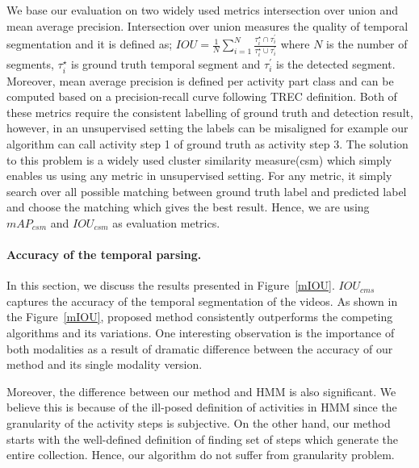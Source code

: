 We base our evaluation on two widely used metrics intersection over union and mean average precision. Intersection over union measures the quality of temporal segmentation and it is defined as; $IOU=\frac{1}{N}\sum_{i=1}^N \frac{\tau^\star_i \cap \tau^\prime_{i}}{\tau^\star_i \cup \tau^\prime_{i}}$ where $N$ is the number of segments, $\tau^\star_i$ is ground truth temporal segment and $\tau^\prime_{i}$ is the detected segment. Moreover, mean average precision is defined per activity part class and can be computed based on a precision-recall curve following TREC\cite{trecc} definition. Both of these metrics require the consistent labelling of ground truth and detection result, however, in an unsupervised setting the labels can be misaligned for example our algorithm can call activity step 1 of ground truth as activity step 3. The solution to this problem is a widely used cluster similarity measure(csm)\cite{liao05} which simply enables us using any metric in unsupervised setting. For any metric, it simply search over all possible matching between ground truth label and predicted label and choose the matching which gives the best result. Hence, we are using $mAP_{csm}$ and $IOU_{csm}$ as evaluation metrics.


\paragraph{Accuracy of the temporal parsing.}
In this section, we discuss the results presented in Figure~\ref{mIOU}. $IOU_{cms}$ captures the accuracy of the temporal segmentation of the videos. As shown in the Figure~\ref{mIOU}, proposed method consistently outperforms the competing algorithms and its variations. One interesting observation is the importance of both modalities as a result of dramatic difference between the accuracy of our method and its single modality version.

Moreover, the difference between our method and HMM is also significant. We believe this is because of the ill-posed definition of activities in HMM since the granularity of the activity steps is subjective. On the other hand, our method starts with the well-defined definition of finding set of steps which generate the entire collection. Hence, our algorithm do not suffer from granularity problem.

